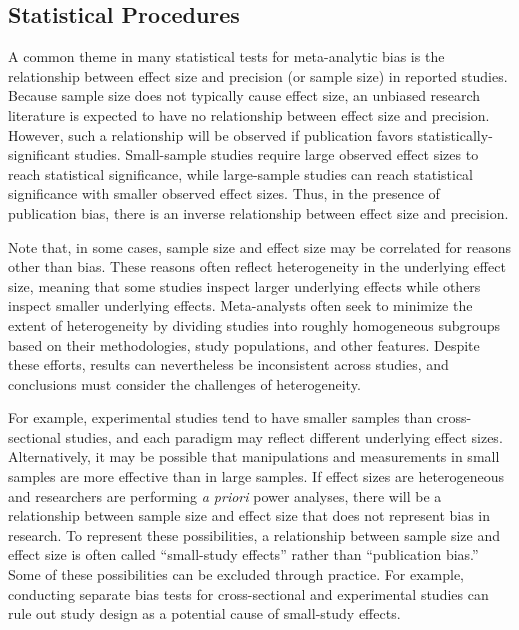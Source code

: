 \documentclass[man, mask]{apa6}
\begin{document}
\subsection{Statistical Procedures}
A common theme in many statistical tests for meta-analytic bias is the relationship between effect size and precision (or sample size) in reported studies. Because sample size does not typically cause effect size, an unbiased research literature is expected to have no relationship between effect size and precision. However, such a relationship will be observed if publication favors statistically-significant studies. Small-sample studies require large observed effect sizes to reach statistical significance, while large-sample studies can reach statistical significance with smaller observed effect sizes. Thus, in the presence of publication bias, there is an inverse relationship between effect size and precision. 

Note that, in some cases, sample size and effect size may be correlated for reasons other than bias. These reasons often reflect heterogeneity in the underlying effect size, meaning that some studies inspect larger underlying effects while others inspect smaller underlying effects. Meta-analysts often seek to minimize the extent of heterogeneity by dividing studies into roughly homogeneous subgroups based on their methodologies, study populations, and other features. Despite these efforts, results can nevertheless be inconsistent across studies, and conclusions must consider the challenges of heterogeneity.

For example, experimental studies tend to have smaller samples than cross-sectional studies, and each paradigm may reflect different underlying effect sizes. Alternatively, it may be possible that manipulations and measurements in small samples are more effective than in large samples. If effect sizes are heterogeneous and researchers are performing {\em a priori} power analyses, there will be a relationship between sample size and effect size that does not represent bias in research.
To represent these possibilities, a relationship between sample size and effect size is often called ``small-study effects'' rather than ``publication bias.'' Some of these possibilities can be excluded through practice. For example, conducting separate bias tests for cross-sectional and experimental studies can rule out study design as a potential cause of small-study effects.
\end{document}
